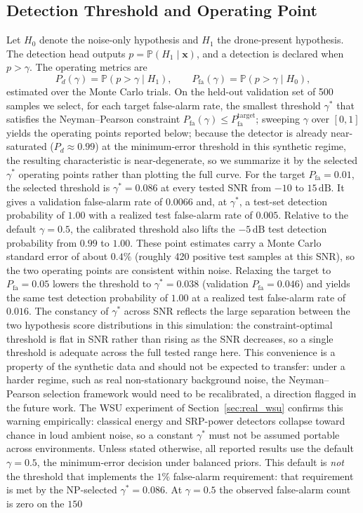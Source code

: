 \documentclass[5p,twocolumn]{elsarticle}
\begin{document}
\subsection{Detection Threshold and Operating Point}
\label{sec:np}
Let $H_0$ denote the noise-only hypothesis and $H_1$ the drone-present hypothesis. The detection head outputs $p=\mathbb{P}(H_1\mid\boldsymbol{x})$, and a detection is declared when $p>\gamma$. The operating metrics are
\begin{equation}
    P_d(\gamma)=\mathbb{P}(p>\gamma\mid H_1), \qquad P_{\mathrm{fa}}(\gamma)=\mathbb{P}(p>\gamma\mid H_0),
    \label{eq:pdpfa}
\end{equation}
estimated over the Monte Carlo trials. On the held-out validation set of 500 samples we select, for each target false-alarm rate, the smallest threshold $\gamma^*$ that satisfies the Neyman--Pearson constraint $P_{\mathrm{fa}}(\gamma)\le P_{\mathrm{fa}}^{\mathrm{target}}$; sweeping $\gamma$ over $[0,1]$ yields the operating points reported below; because the detector is already near-saturated ($P_d\approx0.99$) at the minimum-error threshold in this synthetic regime, the resulting characteristic is near-degenerate, so we summarize it by the selected $\gamma^*$ operating points rather than plotting the full curve. For the target $P_{\mathrm{fa}}=0.01$, the selected threshold is $\gamma^*=0.086$ at every tested SNR from $-10$ to $15\,\mathrm{dB}$. It gives a validation false-alarm rate of $0.0066$ and, at $\gamma^*$, a test-set detection probability of $1.00$ with a realized test false-alarm rate of $0.005$. Relative to the default $\gamma=0.5$, the calibrated threshold also lifts the $-5\,\mathrm{dB}$ test detection probability from $0.99$ to $1.00$. These point estimates carry a Monte Carlo standard error of about $0.4\%$ (roughly 420 positive test samples at this SNR), so the two operating points are consistent within noise. Relaxing the target to $P_{\mathrm{fa}}=0.05$ lowers the threshold to $\gamma^*=0.038$ (validation $P_{\mathrm{fa}}=0.046$) and yields the same test detection probability of $1.00$ at a realized test false-alarm rate of $0.016$. The constancy of $\gamma^*$ across SNR reflects the large separation between the two hypothesis score distributions in this simulation: the constraint-optimal threshold is flat in SNR rather than rising as the SNR decreases, so a single threshold is adequate across the full tested range here. This convenience is a property of the synthetic data and should not be expected to transfer: under a harder regime, such as real non-stationary background noise, the Neyman--Pearson selection framework would need to be recalibrated, a direction flagged in the future work. The WSU experiment of Section~\ref{sec:real_wsu} confirms this warning empirically: classical energy and SRP-power detectors collapse toward chance in loud ambient noise, so a constant $\gamma^*$ must not be assumed portable across environments. Unless stated otherwise, all reported results use the default $\gamma=0.5$, the minimum-error decision under balanced priors. This default is \emph{not} the threshold that implements the $1\%$ false-alarm requirement: that requirement is met by the NP-selected $\gamma^*=0.086$. At $\gamma=0.5$ the observed false-alarm count is zero on the $150$ 
\end{document}
